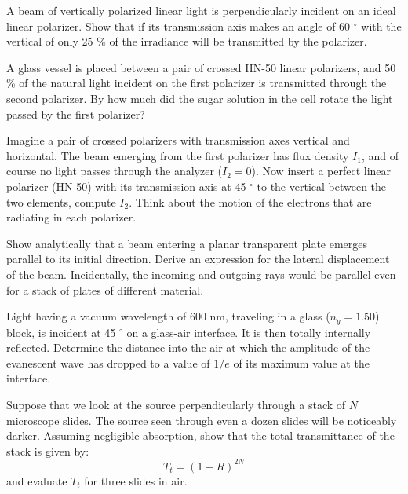 \documentclass[addpoints,10pt]{exam}
\begin{document}
\begin{questions}
		{
			\question
			A beam of vertically polarized linear light is perpendicularly incident on an ideal linear polarizer. Show that if its transmission axis makes an angle of 60 $^\circ$ with the vertical of only 25 \% of the irradiance will be transmitted by the polarizer.
		}
		
		{
			\question
			A glass vessel is placed between a pair of crossed HN-50 linear polarizers, and 50 \% of the natural light incident on the first polarizer is transmitted through the second polarizer. By how much did the sugar solution in the cell rotate the light passed by the first polarizer?
		}
		
		{
			\question
			Imagine a pair of crossed polarizers with transmission axes vertical and horizontal. The beam emerging from the first polarizer has flux density $I_1$, and of course no light passes through the analyzer ($I_2 = 0$). Now insert a perfect linear polarizer (HN-50) with its transmission axis at 45 $^\circ$ to the vertical between the two elements, compute $I_2$. Think about the motion of the electrons that are radiating in each polarizer.
		}
		
		{
			\question
			Show analytically that a beam entering a planar transparent plate emerges parallel to its initial direction. Derive an expression for the lateral displacement of the beam. Incidentally, the incoming and outgoing rays would be parallel even for a stack of plates of different material.
		}
		
		{
			\question
			Light having a vacuum wavelength of 600 nm, traveling in a glass ($n_g = 1.50$) block, is incident at 45 $^\circ$ on a glass-air interface. It is then totally internally reflected. Determine the distance into the air at which the amplitude of the evanescent wave has dropped to a value of $1/e$ of its maximum value at the interface.
		}
		
		{
			\question
			Suppose that we look at the source perpendicularly through a stack of $N$ microscope slides. The source seen through even a dozen slides will be noticeably darker. Assuming negligible absorption, show that the total transmittance of the stack is given by:
			\begin{equation*}
				T_t = (1-R)^{2N}
			\end{equation*}
			and evaluate $T_t$ for three slides in air.
		}
	\end{questions}
	
	
\end{document}
